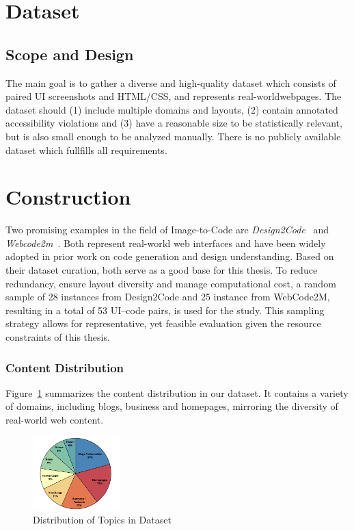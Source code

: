 \begingroup
    
\endgroup


\section{Dataset}
\label{subchapter:Dataset}
\subsection{Scope and Design}
The main goal is to gather a diverse and high-quality dataset which consists of 
paired UI screenshots and HTML/CSS, and represents
real-worldwebpages. The dataset should (1) include multiple domains and layouts,
(2) contain annotated accessibility violations and (3) have a reasonable size to be
statistically relevant, but is also small enough to be analyzed manually.
There is no publicly available dataset which fullfills all requirements.

\section{Construction}
Two promising examples in the field of Image-to-Code are \textit{Design2Code}~\parencite{si2024design2code} 
and \textit{Webcode2m}~\parencite{gui2024webcode2m}. 
Both represent real-world web
interfaces and have been widely adopted in prior work on code generation 
and design understanding. Based on their
dataset curation, both serve as a good base for this thesis.\newline
To reduce redundancy, ensure layout diversity and manage computational cost, a random sample of
28 instances from Design2Code and 25 instance from WebCode2M, resulting in a total of 53 UI–code
pairs, is used for the study. This sampling strategy allows for representative, yet feasible evaluation 
given the resource constraints of this thesis.

\subsubsection{Content Distribution}
Figure~\ref{fig:dataset_distribution} summarizes the content distribution in our dataset.
It contains a variety of domains, including blogs, business and homepages, mirroring the 
diversity of real-world web content.

\begin{figure}[htbp]
  \centering
  \includegraphics[width=0.3\textwidth]{figures/dataset_distribution.png}
  \caption{Distribution of Topics in Dataset}
  \label{fig:dataset_distribution}
\end{figure}

